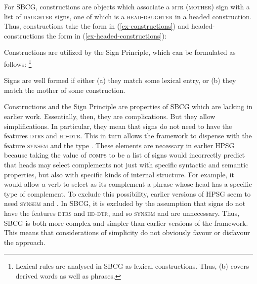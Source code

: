 \documentclass[output=paper
	        ,collection
	        ,collectionchapter
 	        ,biblatex
                ,babelshorthands
                ,newtxmath
                ,draftmode
                ,colorlinks, citecolor=brown
]{langscibook}
\begin{document}
For SBCG, constructions are objects which associate a \textsc{mtr} (\textsc{mother}) sign with a list of \textsc{daughter} signs, one of which is a \textsc{head-daughter} in a headed construction. Thus, constructions take the form in (\ref{ex-constructions}) and headed-constructions the form in (\ref{ex-headed-constructions}):

\eal\label{ex:prop48}
\ex\label{ex:prop48a}\label{ex-constructions}
	
	
\ex\label{ex:prop48b}\label{ex-headed-constructions}
\zl

\noindent
Constructions are utilized by the Sign Principle, which can be formulated as follows:%
%
\footnote{Lexical rules are analysed in SBCG as lexical constructions. Thus, (b) covers derived words as well as phrases.}
%

\ea\label{ex:prop49}
Signs are well formed if either (a) they match some lexical entry, or (b) they match the mother of some construction.
\z

\noindent
Constructions and the Sign Principle are properties of SBCG which are lacking in earlier
work. Essentially, then, they are complications. But they allow simplifications. In particular, they
mean that signs do not need to have the features \textsc{dtrs} and \textsc{hd-dtr}. This in turn
allows the framework to dispense with the feature \textsc{synsem} and the type . These
elements are necessary in earlier HPSG because taking the value of \textsc{comps} to be a list of
signs would incorrectly predict that heads may select complements not just with specific syntactic
and semantic properties, but also with specific kinds of internal structure. For example, it would
allow a verb to select as its complement a phrase whose head has a specific type of complement. To
exclude this possibility, earlier versions of HPSG seem to need \textsc{synsem} and 
\citep[]{ps2}. In SBCG, it is excluded by the assumption that signs do not have the features
\textsc{dtrs} and \textsc{hd-dtr}, and so \textsc{synsem} and  are unnecessary. Thus,
SBCG is both more complex and simpler than earlier versions of the framework. This means that
considerations of simplicity do not obviously favour or disfavour the approach. 
\end{document}
